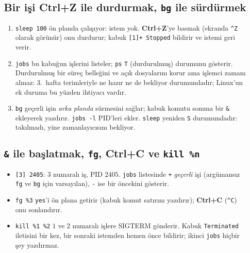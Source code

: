 \documentclass[11pt,a4paper]{article}
\newcommand{\cmd}[1]{\texttt{#1}}
\begin{document}
\subsection{Bir işi Ctrl+Z ile durdurmak, \texttt{bg} ile sürdürmek}



\begin{enumerate}[leftmargin=1.4em]
  \item \cmd{sleep 100} ön planda çalışıyor: istem yok. \textbf{Ctrl+Z}'ye basmak (ekranda \texttt{\^{}Z} olarak görünür) onu durdurur; kabuk \texttt{[1]+ Stopped} bildirir ve istemi geri verir.
  \item \cmd{jobs} bu kabuğun işlerini listeler; \cmd{ps} \texttt{T} (durdurulmuş) durumunu gösterir. Durdurulmuş bir süreç belleğini ve açık dosyalarını korur ama işlemci zamanı almaz: 3.~hafta terimleriyle ne hazır ne de bekliyor durumundadır; Linux'un ek duruma bu yüzden ihtiyacı vardır.
  \item \cmd{bg} geçerli işin \emph{arka planda} sürmesini sağlar; kabuk komutu sonuna bir \texttt{\&} ekleyerek yazdırır. \cmd{jobs -l} PID'leri ekler. \cmd{sleep} yeniden \texttt{S} durumundadır: takılmadı, yine zamanlayıcısını bekliyor.
\end{enumerate}

\subsection{\texttt{\&} ile başlatmak, \texttt{fg}, Ctrl+C ve \texttt{kill \%n}}



\begin{itemize}
  \item \texttt{[3] 2405}: $3$ numaralı iş, PID $2405$. \cmd{jobs} listesinde \texttt{+} \emph{geçerli} işi (argümansız \cmd{fg} ve \cmd{bg} için varsayılan), \texttt{-} ise bir öncekini gösterir.
  \item \cmd{fg \%3} \cmd{yes}'i ön plana getirir (kabuk komut satırını yazdırır); \textbf{Ctrl+C} (\texttt{\^{}C}) onu sonlandırır.
  \item \cmd{kill \%1 \%2} $1$ ve $2$ numaralı işlere SIGTERM gönderir. Kabuk \texttt{Terminated} iletisini bir kez, bir sonraki istemden hemen önce bildirir; ikinci \cmd{jobs} hiçbir şey yazdırmaz.
\end{itemize}
\end{document}
